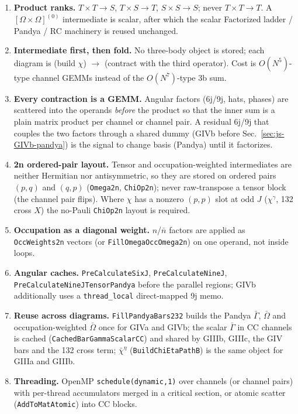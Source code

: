 \documentclass[enabledeprecatedfontcommands]{scrartcl}
\newcommand{\codename}[1]{\texttt{#1}}
\begin{document}
\begin{enumerate}
  \item \textbf{Product ranks.} $T\times T\to S$, $T\times S\to T$,
    $S\times S\to S$; never $T\times T\to T$. A $[\Omega\times\Omega]^{(0)}$
    intermediate is scalar, after which the scalar Factorized ladder /
    Pandya / RC machinery is reused unchanged.
  \item \textbf{Intermediate first, then fold.} No three-body object is
    stored; each diagram is (build $\chi$) $\to$ (contract with the third
    operator). Cost is $O(N^5)$-type channel GEMMs instead of the
    $O(N^7)$-type 3b sum.
  \item \textbf{Every contraction is a GEMM.} Angular factors (6j/9j,
    hats, phases) are scattered into the operands \emph{before} the
    product so that the inner sum is a plain matrix product per channel or
    channel pair. A residual 6j/9j that couples the two factors
    through a shared dummy (GIVb before Sec.~\ref{sec:js-GIVb-pandya})
    is the signal to change basis (Pandya) until it factorizes.
  \item \textbf{2n ordered-pair layout.} Tensor and occupation-weighted
    intermediates are neither Hermitian nor antisymmetric, so they are
    stored on ordered pairs $(p,q)$ and $(q,p)$
    (\codename{Omega2n}, \codename{ChiOp2n}); never raw-transpose a tensor
    block (the channel pair flips). Where $\chi$ has a nonzero $(p,p)$
    slot at odd $J$ ($\chi^\gamma$, 132 cross $\hat X$) the no-Pauli
    \codename{ChiOp2n} layout is required.
  \item \textbf{Occupation as a diagonal weight.} $n$/$\bar n$ factors
    are applied as \codename{OccWeights2n} vectors (or
    \codename{FillOmegaOccOmega2n}) on one operand, not inside loops.
  \item \textbf{Angular caches.} \codename{PreCalculateSixJ},
    \codename{PreCalculateNineJ}, \codename{PreCalculateNineJTensorPandya}
    before the parallel regions; GIVb additionally uses a
    \codename{thread\_local} direct-mapped 9j memo.
  \item \textbf{Reuse across diagrams.} \codename{FillPandyaBars232}
    builds the Pandya $\bar\Gamma$, $\bar\Omega$ and occupation-weighted
    $\bar\Omega$ once for GIVa and GIVb; the scalar $\bar\Gamma$ in CC
    channels is cached (\codename{CachedBarGammaScalarCC}) and shared by
    GIIIb, GIIIc, the GIV bars and the 132 cross term; $\bar\chi^\eta$
    (\codename{BuildChiEtaPathB}) is the same object for GIIIa and GIIIb.
  \item \textbf{Threading.} OpenMP \texttt{schedule(dynamic,1)} over
    channels (or channel pairs) with per-thread accumulators merged in a
    critical section, or atomic scatter (\codename{AddToMatAtomic}) into
    CC blocks.
\end{enumerate}
\end{document}
